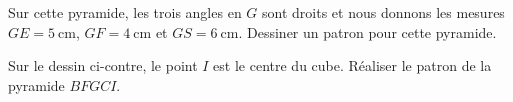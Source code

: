 
\begin{exercice}\label{exo2smath-0184}

\begin{wrapfigure}{r}{3.0cm}
   \vspace{-0.5cm}        %
   \centering
   
\end{wrapfigure}

Sur cette pyramide, les trois angles en \( G\) sont droits et nous donnons les mesures \( GE=\SI{5}{\centi\meter}\), \( GF=\SI{4}{\centi\meter}\) et \( GS=\SI{6}{\centi\meter}\). Dessiner un patron pour cette pyramide.


    \begin{multicols}{2}
    Sur le dessin ci-contre, le point \( I\) est le centre du cube. Réaliser le patron de la pyramide \( BFGCI\).

 \columnbreak

\begin{center}
   
\end{center}
    \end{multicols}



\end{exercice}
